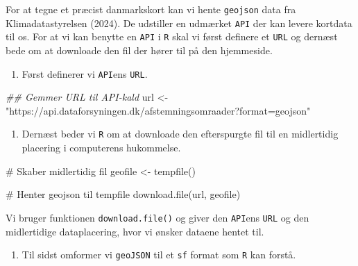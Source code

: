 \documentclass[
  a4paper,
  DIV=11,
  numbers=noendperiod,
  oneside]{scrartcl}
\newenvironment{Shaded}{\begin{snugshade}}{\end{snugshade}}
\newcommand{\CommentTok}[1]{\textcolor[rgb]{0.37,0.37,0.37}{#1}}
\newcommand{\DocumentationTok}[1]{\textcolor[rgb]{0.37,0.37,0.37}{\textit{#1}}}
\newcommand{\FunctionTok}[1]{\textcolor[rgb]{0.28,0.35,0.67}{#1}}
\newcommand{\NormalTok}[1]{\textcolor[rgb]{0.00,0.23,0.31}{#1}}
\newcommand{\OtherTok}[1]{\textcolor[rgb]{0.00,0.23,0.31}{#1}}
\newcommand{\StringTok}[1]{\textcolor[rgb]{0.13,0.47,0.30}{#1}}
\providecommand{\tightlist}{%
  \setlength{\itemsep}{0pt}\setlength{\parskip}{0pt}}\usepackage{longtable,booktabs,array}
\begin{document}
For at tegne et præcist danmarkskort kan vi hente \texttt{geojson} data
fra Klimadatastyrelsen (2024). De udstiller en udmærket \texttt{API} der
kan levere kortdata til os. For at vi kan benytte en \texttt{API} i
\texttt{R} skal vi først definere et \texttt{URL} og dernæst bede om at
downloade den fil der hører til på den hjemmeside.

\begin{enumerate}
\def\labelenumi{\arabic{enumi}.}
\tightlist
\item
  Først definerer vi \texttt{API}ens \texttt{URL}.
\end{enumerate}

\begin{Shaded}
\begin{Highlighting}[]
\DocumentationTok{\#\# Gemmer URL til API{-}kald}
\NormalTok{url }\OtherTok{\textless{}{-}} \StringTok{"https://api.dataforsyningen.dk/afstemningsomraader?format=geojson"}
\end{Highlighting}
\end{Shaded}


\begin{enumerate}
\def\labelenumi{\arabic{enumi}.}
\setcounter{enumi}{1}
\tightlist
\item
  Dernæst beder vi \texttt{R} om at downloade den efterspurgte fil til
  en midlertidig placering i computerens hukommelse.
\end{enumerate}

\begin{Shaded}
\begin{Highlighting}[]
\CommentTok{\# Skaber midlertidig fil}
\NormalTok{geofile }\OtherTok{\textless{}{-}} \FunctionTok{tempfile}\NormalTok{()}

\CommentTok{\# Henter geojson til tempfile}
\FunctionTok{download.file}\NormalTok{(url, geofile)}
\end{Highlighting}
\end{Shaded}

Vi bruger funktionen \texttt{download.file()} og giver den
\texttt{API}ens \texttt{URL} og den midlertidige dataplacering, hvor vi
ønsker dataene hentet til.

\begin{enumerate}
\def\labelenumi{\arabic{enumi}.}
\setcounter{enumi}{2}
\tightlist
\item
  Til sidst omformer vi \texttt{geoJSON} til et \texttt{sf} format som
  \texttt{R} kan forstå.
\end{enumerate}
\end{document}
